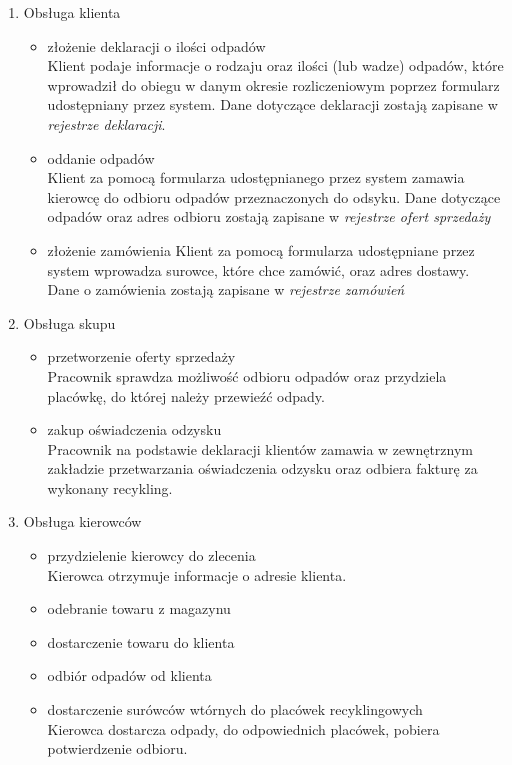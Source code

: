 
\begin{enumerate}
	\item Obsługa klienta
		\begin{itemize}
			\item złożenie deklaracji o ilości odpadów \\
			Klient podaje informacje o rodzaju oraz ilości (lub wadze) odpadów, które wprowadził do obiegu w danym okresie rozliczeniowym poprzez formularz udostępniany przez system. Dane dotyczące deklaracji zostają zapisane w \emph{rejestrze deklaracji}.
			\item oddanie odpadów \\
			Klient za pomocą formularza udostępnianego przez system zamawia kierowcę do odbioru odpadów przeznaczonych do odsyku.
			Dane dotyczące odpadów oraz adres odbioru zostają zapisane w \emph{rejestrze ofert sprzedaży}
			\item złożenie zamówienia
			Klient za pomocą formularza udostępniane przez system wprowadza surowce, które chce zamówić, oraz adres dostawy. Dane o zamówienia zostają zapisane w \emph{rejestrze zamówień}
		\end{itemize}

	\item Obsługa skupu
		\begin{itemize}
			\item przetworzenie oferty sprzedaży \\
			Pracownik sprawdza możliwość odbioru odpadów oraz przydziela placówkę, do której należy przewieźć odpady.
			\item zakup oświadczenia odzysku \\ 
			Pracownik na podstawie deklaracji klientów zamawia w zewnętrznym zakładzie przetwarzania oświadczenia odzysku oraz odbiera fakturę za wykonany recykling.
		\end{itemize}

	\item Obsługa kierowców 
		\begin{itemize}
			\item przydzielenie kierowcy do zlecenia \\
			Kierowca otrzymuje informacje o adresie klienta.
			\item odebranie towaru z magazynu 
			\item dostarczenie towaru do klienta
			\item odbiór odpadów od klienta
			\item dostarczenie surówców wtórnych do placówek recyklingowych \\
			Kierowca dostarcza odpady, do odpowiednich placówek, pobiera potwierdzenie odbioru.
		\end{itemize}


\end{enumerate}
